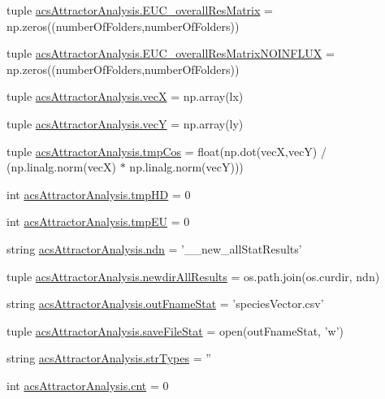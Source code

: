\begin{DoxyCompactItemize}
tuple \hyperlink{a00096_a920167afed4efad8feefc27bdbadba89}{acs\-Attractor\-Analysis.\-E\-U\-C\-\_\-overall\-Res\-Matrix} = np.\-zeros((number\-Of\-Folders,number\-Of\-Folders))
\item 
tuple \hyperlink{a00096_a4214c876be4247f0643fc749beb35787}{acs\-Attractor\-Analysis.\-E\-U\-C\-\_\-overall\-Res\-Matrix\-N\-O\-I\-N\-F\-L\-U\-X} = np.\-zeros((number\-Of\-Folders,number\-Of\-Folders))
\item 
tuple \hyperlink{a00096_af20e9c92b7d977049b881882c0d1382c}{acs\-Attractor\-Analysis.\-vec\-X} = np.\-array(lx)
\item 
tuple \hyperlink{a00096_a691fb5bd87af2162b5acaf48ea4c06e7}{acs\-Attractor\-Analysis.\-vec\-Y} = np.\-array(ly)
\item 
tuple \hyperlink{a00096_a305669433b259c5ffcb797769e7c30df}{acs\-Attractor\-Analysis.\-tmp\-Cos} = float(np.\-dot(vec\-X,vec\-Y) / (np.\-linalg.\-norm(vec\-X) $\ast$ np.\-linalg.\-norm(vec\-Y)))
\item 
int \hyperlink{a00096_a1fe1582f1d1dc5f55558d25c8eb30ad7}{acs\-Attractor\-Analysis.\-tmp\-H\-D} = 0
\item 
int \hyperlink{a00096_a0c4860774229747cda9dabe70614abc6}{acs\-Attractor\-Analysis.\-tmp\-E\-U} = 0
\item 
string \hyperlink{a00096_a109ce3a379d650b3f9b08debc0433a19}{acs\-Attractor\-Analysis.\-ndn} = '\-\_\-\_\-new\-\_\-all\-Stat\-Results'
\item 
tuple \hyperlink{a00096_ae620f985669aed90dc070824420d4b5e}{acs\-Attractor\-Analysis.\-newdir\-All\-Results} = os.\-path.\-join(os.\-curdir, ndn)
\item 
string \hyperlink{a00096_aeecfcdefbc44b2b2ceff4c9b6f737f27}{acs\-Attractor\-Analysis.\-out\-Fname\-Stat} = 'species\-Vector.\-csv'
\item 
tuple \hyperlink{a00096_acc1016f353d0e1b36c837cb0b480edef}{acs\-Attractor\-Analysis.\-save\-File\-Stat} = open(out\-Fname\-Stat, 'w')
\item 
string \hyperlink{a00096_ae5f324ca114055fca79473eecd17bb80}{acs\-Attractor\-Analysis.\-str\-Types} = ''
\item 
int \hyperlink{a00096_a8ec106a228fafb4c290946a7b7f8b6da}{acs\-Attractor\-Analysis.\-cnt} = 0
\end{DoxyCompactItemize}
